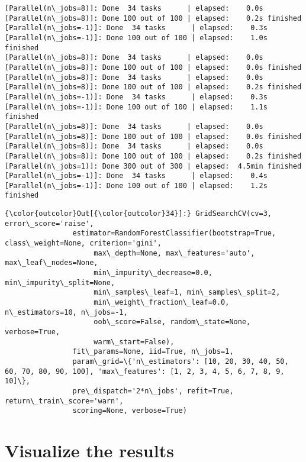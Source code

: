 \documentclass[11pt]{article}
\begin{document}
\begin{Verbatim}[commandchars=\\\{\}]
[Parallel(n\_jobs=8)]: Done  34 tasks      | elapsed:    0.0s
[Parallel(n\_jobs=8)]: Done 100 out of 100 | elapsed:    0.2s finished
[Parallel(n\_jobs=-1)]: Done  34 tasks      | elapsed:    0.3s
[Parallel(n\_jobs=-1)]: Done 100 out of 100 | elapsed:    1.0s finished
[Parallel(n\_jobs=8)]: Done  34 tasks      | elapsed:    0.0s
[Parallel(n\_jobs=8)]: Done 100 out of 100 | elapsed:    0.0s finished
[Parallel(n\_jobs=8)]: Done  34 tasks      | elapsed:    0.0s
[Parallel(n\_jobs=8)]: Done 100 out of 100 | elapsed:    0.2s finished
[Parallel(n\_jobs=-1)]: Done  34 tasks      | elapsed:    0.3s
[Parallel(n\_jobs=-1)]: Done 100 out of 100 | elapsed:    1.1s finished
[Parallel(n\_jobs=8)]: Done  34 tasks      | elapsed:    0.0s
[Parallel(n\_jobs=8)]: Done 100 out of 100 | elapsed:    0.0s finished
[Parallel(n\_jobs=8)]: Done  34 tasks      | elapsed:    0.0s
[Parallel(n\_jobs=8)]: Done 100 out of 100 | elapsed:    0.2s finished
[Parallel(n\_jobs=1)]: Done 300 out of 300 | elapsed:  4.5min finished
[Parallel(n\_jobs=-1)]: Done  34 tasks      | elapsed:    0.4s
[Parallel(n\_jobs=-1)]: Done 100 out of 100 | elapsed:    1.2s finished

    \end{Verbatim}

\begin{Verbatim}[commandchars=\\\{\}]
{\color{outcolor}Out[{\color{outcolor}34}]:} GridSearchCV(cv=3, error\_score='raise',
                estimator=RandomForestClassifier(bootstrap=True, class\_weight=None, criterion='gini',
                     max\_depth=None, max\_features='auto', max\_leaf\_nodes=None,
                     min\_impurity\_decrease=0.0, min\_impurity\_split=None,
                     min\_samples\_leaf=1, min\_samples\_split=2,
                     min\_weight\_fraction\_leaf=0.0, n\_estimators=10, n\_jobs=-1,
                     oob\_score=False, random\_state=None, verbose=True,
                     warm\_start=False),
                fit\_params=None, iid=True, n\_jobs=1,
                param\_grid=\{'n\_estimators': [10, 20, 30, 40, 50, 60, 70, 80, 90, 100], 'max\_features': [1, 2, 3, 4, 5, 6, 7, 8, 9, 10]\},
                pre\_dispatch='2*n\_jobs', refit=True, return\_train\_score='warn',
                scoring=None, verbose=True)
\end{Verbatim}
            
    \section{Visualize the results}\label{visualize-the-results}
\end{document}

